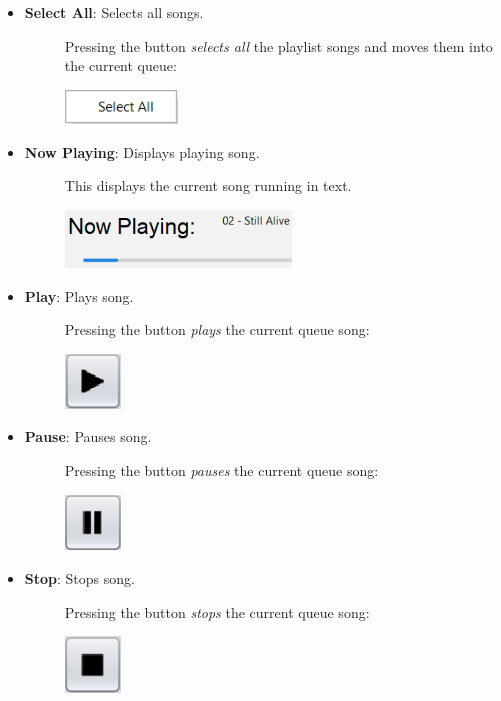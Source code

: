 \documentclass{article}
\begin{document}
\begin{itemize}
    \item \textbf{Select All}: Selects all songs.
    \begin{description}
        \item[] Pressing the button \textit{selects all} the playlist songs and moves them into the current queue:
        \item[] \includegraphics[width=3cm]{Images/Play Select All.png}
    \end{description}
    \item \textbf{Now Playing}: Displays playing song.
    \begin{description}
        \item[] This displays the current song running in text.
        \item[] \includegraphics[width=6cm]{Images/JBar Update 05 02 2023.png}
    \end{description}
    \item \textbf{Play}: Plays song.
    \begin{description}
        \item[] Pressing the button \textit{plays} the current queue song:
        \item[] \includegraphics[width=1.5cm]{Images/Play.png}
    \end{description}
    \item \textbf{Pause}: Pauses song.
    \begin{description}
        \item[] Pressing the button \textit{pauses} the current queue song:
        \item[] \includegraphics[width=1.5cm]{Images/Pause.png}
    \end{description}
    \item \textbf{Stop}: Stops song.
    \begin{description}
        \item[] Pressing the button \textit{stops} the current queue song:
        \item[] \includegraphics[width=1.5cm]{Images/Stop.png}
    \end{description}

\end{itemize}
\end{document}
